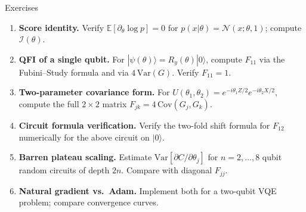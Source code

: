 \documentclass[aspectratio=169,10pt]{beamer}
\newcommand{\E}{\mathbb{E}}
\newcommand{\Variance}{\mathrm{Var}}
\newcommand{\FI}{\mathcal{I}}    %
\begin{document}
\begin{frame}{Exercises}
  \begin{enumerate}\itemsep3pt
    \item \textbf{Score identity.}
          Verify $\E[\partial_\theta\log p]=0$ for
          $p(x|\theta)=\mathcal{N}(x;\theta,1)$;
          compute $\FI(\theta)$.

    \item \textbf{QFI of a single qubit.}
          For $|\psi(\theta)\rangle=R_y(\theta)|0\rangle$,
          compute $F_{11}$ via the Fubini--Study formula
          and via $4\,\Variance(G)$.
          Verify $F_{11}=1$.

    \item \textbf{Two-parameter covariance form.}
          For $U(\theta_1,\theta_2)
            =e^{-i\theta_1 Z/2}e^{-i\theta_2 X/2}$,
          compute the full $2\times 2$ matrix
          $F_{jk}=4\,\mathrm{Cov}(G_j,G_k)$.

    \item \textbf{Circuit formula verification.}
          Verify the two-fold shift formula for $F_{12}$
          numerically for the above circuit on $|0\rangle$.

    \item \textbf{Barren plateau scaling.}
          Estimate
          $\Variance[\partial C/\partial\theta_j]$ for
          $n=2,\ldots,8$ qubit random circuits of depth $2n$.
          Compare with diagonal $F_{jj}$.

    \item \textbf{Natural gradient vs.\ Adam.}
          Implement both for a two-qubit VQE problem;
          compare convergence curves.
  \end{enumerate}
\end{frame}
\end{document}
